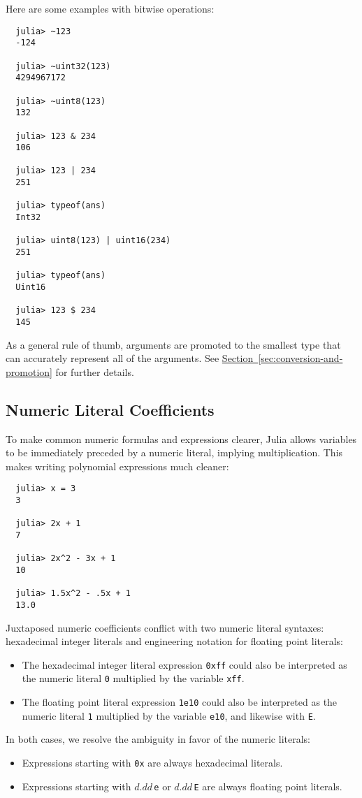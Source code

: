 \documentclass{article}
\newcommand{\Section}[1]{\hyperref[sec:#1]{Section~\ref*{sec:#1}}}
\begin{document}
Here are some examples with bitwise operations:
\begin{verbatim}
  julia> ~123
  -124

  julia> ~uint32(123)
  4294967172

  julia> ~uint8(123)
  132

  julia> 123 & 234
  106

  julia> 123 | 234
  251

  julia> typeof(ans)
  Int32

  julia> uint8(123) | uint16(234)
  251

  julia> typeof(ans)
  Uint16

  julia> 123 $ 234
  145
\end{verbatim}
As a general rule of thumb, arguments are promoted to the smallest type that can accurately represent all of the arguments. See \Section{conversion-and-promotion} for further details.

\subsection{Numeric Literal Coefficients}

To make common numeric formulas and expressions clearer, Julia allows variables to be immediately preceded by a numeric literal, implying multiplication.
This makes writing polynomial expressions much cleaner:
\begin{verbatim}
  julia> x = 3
  3

  julia> 2x + 1
  7

  julia> 2x^2 - 3x + 1
  10

  julia> 1.5x^2 - .5x + 1
  13.0
\end{verbatim}
Juxtaposed numeric coefficients conflict with two numeric literal syntaxes:
hexadecimal integer literals and engineering notation for floating point literals:
\begin{itemize}
\item The hexadecimal integer literal expression \verb|0xff| could also be interpreted as the numeric literal \verb|0| multiplied by the variable \verb|xff|.
\item The floating point literal expression \verb|1e10| could also be interpreted as the numeric literal \verb|1| multiplied by the variable \verb|e10|, and likewise with \verb|E|.
\end{itemize}
In both cases, we resolve the ambiguity in favor of the numeric literals:
\begin{itemize}
\item Expressions starting with \verb|0x| are always hexadecimal literals.
\item Expressions starting with $d.dd$\,\verb|e| or $d.dd$\,\verb|E| are always floating point literals.
\end{itemize}
\end{document}

